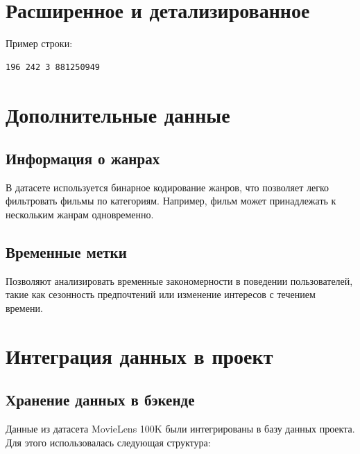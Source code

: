 \section{Расширенное и детализированное}

Пример строки:
\begin{verbatim}
196 242 3 881250949
\end{verbatim}

\section{Дополнительные данные}
\subsection*{Информация о жанрах}
В датасете используется бинарное кодирование жанров, что позволяет легко фильтровать фильмы по категориям. Например, фильм может принадлежать к нескольким жанрам одновременно.

\subsection*{Временные метки}
Позволяют анализировать временные закономерности в поведении пользователей, такие как сезонность предпочтений или изменение интересов с течением времени.

\section{Интеграция данных в проект}

\subsection*{Хранение данных в бэкенде}
Данные из датасета MovieLens 100K были интегрированы в базу данных проекта. Для этого использовалась следующая структура:

